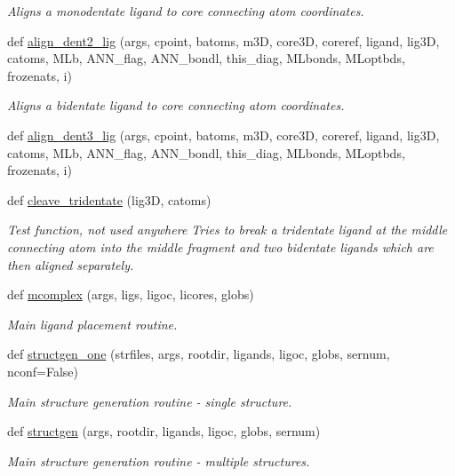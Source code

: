 \begin{DoxyCompactItemize}
\begin{DoxyCompactList}\small\item\em Aligns a monodentate ligand to core connecting atom coordinates. \end{DoxyCompactList}\item 
def \hyperlink{namespacemolSimplify_1_1Scripts_1_1structgen_a458be04ee9ec1f9d32c81b5b7448fcec}{align\+\_\+dent2\+\_\+lig} (args, cpoint, batoms, m3D, core3D, coreref, ligand, lig3D, catoms, M\+Lb, A\+N\+N\+\_\+flag, A\+N\+N\+\_\+bondl, this\+\_\+diag, M\+Lbonds, M\+Loptbds, frozenats, i)
\begin{DoxyCompactList}\small\item\em Aligns a bidentate ligand to core connecting atom coordinates. \end{DoxyCompactList}\item 
def \hyperlink{namespacemolSimplify_1_1Scripts_1_1structgen_aec44e2d61af1c52926478b5b138b8248}{align\+\_\+dent3\+\_\+lig} (args, cpoint, batoms, m3D, core3D, coreref, ligand, lig3D, catoms, M\+Lb, A\+N\+N\+\_\+flag, A\+N\+N\+\_\+bondl, this\+\_\+diag, M\+Lbonds, M\+Loptbds, frozenats, i)
\item 
def \hyperlink{namespacemolSimplify_1_1Scripts_1_1structgen_a9bd3ad91740926954046d231532e5ebe}{cleave\+\_\+tridentate} (lig3D, catoms)
\begin{DoxyCompactList}\small\item\em Test function, not used anywhere Tries to break a tridentate ligand at the middle connecting atom into the middle fragment and two bidentate ligands which are then aligned separately. \end{DoxyCompactList}\item 
def \hyperlink{namespacemolSimplify_1_1Scripts_1_1structgen_a343f959db73f414f9f717d2a7f2ab18c}{mcomplex} (args, ligs, ligoc, licores, globs)
\begin{DoxyCompactList}\small\item\em Main ligand placement routine. \end{DoxyCompactList}\item 
def \hyperlink{namespacemolSimplify_1_1Scripts_1_1structgen_ac02db5841c0976072db2c43a255a4863}{structgen\+\_\+one} (strfiles, args, rootdir, ligands, ligoc, globs, sernum, nconf=False)
\begin{DoxyCompactList}\small\item\em Main structure generation routine -\/ single structure. \end{DoxyCompactList}\item 
def \hyperlink{namespacemolSimplify_1_1Scripts_1_1structgen_a88cde12602c0445fff9fe6921415aad4}{structgen} (args, rootdir, ligands, ligoc, globs, sernum)
\begin{DoxyCompactList}\small\item\em Main structure generation routine -\/ multiple structures. \end{DoxyCompactList}\end{DoxyCompactItemize}
